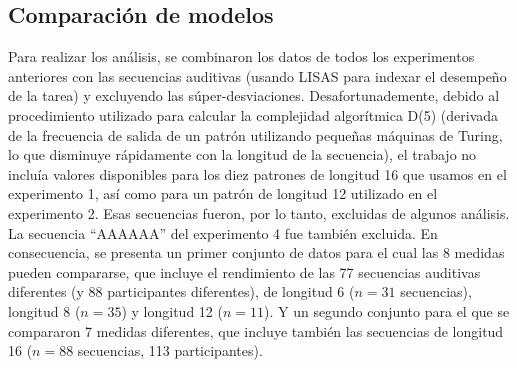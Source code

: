 
 \subsection{Comparación de modelos}
 
 
 Para realizar los análisis, se combinaron los datos de todos los experimentos anteriores con las secuencias auditivas (usando LISAS para indexar el desempeño de la tarea) y excluyendo las súper-desviaciones. Desafortunademente, debido al procedimiento utilizado para calcular la complejidad algorítmica D(5) (derivada de la frecuencia de salida de un patrón utilizando pequeñas máquinas de Turing, lo que disminuye rápidamente con la longitud de la secuencia), el trabajo no incluía valores disponibles para los diez patrones de longitud 16 que usamos en el experimento 1, así como para un patrón de longitud 12 utilizado en el experimento 2. Esas secuencias fueron, por lo tanto, excluidas de algunos análisis. La secuencia ``AAAAAA'' del experimento 4 fue también excluida. En consecuencia, se presenta un primer conjunto de datos para el cual las 8 medidas pueden compararse, que incluye el rendimiento de las 77 secuencias auditivas diferentes (y 88 participantes diferentes), de longitud 6 ($n = 31$ secuencias), longitud 8 ($n = 35$) y longitud 12 ($n= 11$). Y un segundo conjunto para el que se compararon 7 medidas diferentes, que incluye también las secuencias de longitud 16 ($n = 88$ secuencias, 113 participantes).
 
